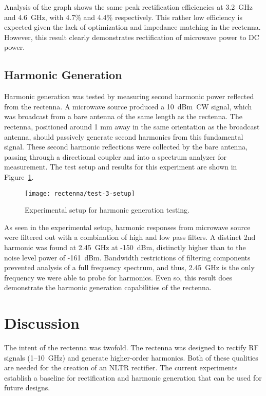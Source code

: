 Analysis of the graph shows the same peak rectification efficiencies at 3.2~GHz and 4.6~GHz, with 4.7\% and 4.4\% respectively. This rather low efficiency is expected given the lack of optimization and impedance matching in the rectenna. However, this result clearly demonstrates rectification of microwave power to DC power.

\subsection{Harmonic Generation}

Harmonic generation was tested by measuring second harmonic power reflected from the rectenna. A microwave source produced  a 10~dBm~CW signal, which was broadcast from a bare antenna of the same length as the rectenna. The rectenna, positioned around 1 mm away in the same orientation as the broadcast antenna, should passively generate second harmonics from this fundamental signal. These second harmonic reflections were collected by the bare antenna, passing through a directional coupler and into a spectrum analyzer for measurement. The test setup and results for this experiment are shown in Figure~\ref{fig:rectenna-test-3-setup}.

\begin{figure}[]
\centering
\texttt{[image: rectenna/test-3-setup]}
\caption{Experimental setup for harmonic generation testing.}
\label{fig:rectenna-test-3-setup}
\end{figure}

As seen in the experimental setup, harmonic responses from microwave source were filtered out with a combination of high and low pass filters. A distinct 2nd harmonic was found at 2.45~GHz at -150~dBm, distinctly higher than to the noise level power of -161~dBm. Bandwidth restrictions of filtering components prevented analysis of a full frequency spectrum, and thus, 2.45~GHz is the only frequency we were able to probe for harmonics. Even so, this result does demonstrate the harmonic generation capabilities of the rectenna.

\section{Discussion}
\label{sec:rectenna-discussion}

The intent of the rectenna was twofold. The rectenna was designed to rectify RF signals (\numrange{1}{10}~GHz) and generate higher-order harmonics. Both of these qualities are needed for the creation of an NLTR rectifier. The current experiments establish a baseline for rectification and harmonic generation that can be used for future designs.

